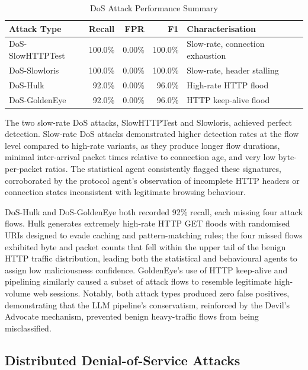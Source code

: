 \documentclass[../main.tex]{subfiles}
\begin{document}
\begin{table}[H]
\centering
\caption{DoS Attack Performance Summary}
\label{tab:dos-performance}
\begin{tabularx}{\textwidth}{l r r r X}
\toprule
Attack Type & Recall & FPR & F1 & Characterisation \\
\midrule
DoS-SlowHTTPTest & 100.0\% & 0.00\% & 100.0\% & Slow-rate, connection exhaustion \\
DoS-Slowloris & 100.0\% & 0.00\% & 100.0\% & Slow-rate, header stalling \\
DoS-Hulk & 92.0\% & 0.00\% & 96.0\% & High-rate HTTP flood \\
DoS-GoldenEye & 92.0\% & 0.00\% & 96.0\% & HTTP keep-alive flood \\
\bottomrule
\end{tabularx}
\end{table}

The two slow-rate DoS attacks, SlowHTTPTest and Slowloris, achieved perfect detection. Slow-rate DoS attacks demonstrated higher detection rates at the flow level compared to high-rate variants, as they produce longer flow durations, minimal inter-arrival packet times relative to connection age, and very low byte-per-packet ratios. The statistical agent consistently flagged these signatures, corroborated by the protocol agent's observation of incomplete HTTP headers or connection states inconsistent with legitimate browsing behaviour.

DoS-Hulk and DoS-GoldenEye both recorded 92\% recall, each missing four attack flows. Hulk generates extremely high-rate HTTP GET floods with randomised URIs designed to evade caching and pattern-matching rules; the four missed flows exhibited byte and packet counts that fell within the upper tail of the benign HTTP traffic distribution, leading both the statistical and behavioural agents to assign low maliciousness confidence. GoldenEye's use of HTTP keep-alive and pipelining similarly caused a subset of attack flows to resemble legitimate high-volume web sessions. Notably, both attack types produced zero false positives, demonstrating that the LLM pipeline's conservatism, reinforced by the Devil's Advocate mechanism, prevented benign heavy-traffic flows from being misclassified.

\subsection{Distributed Denial-of-Service Attacks}
\label{sec:ddos-attacks}
\end{document}

